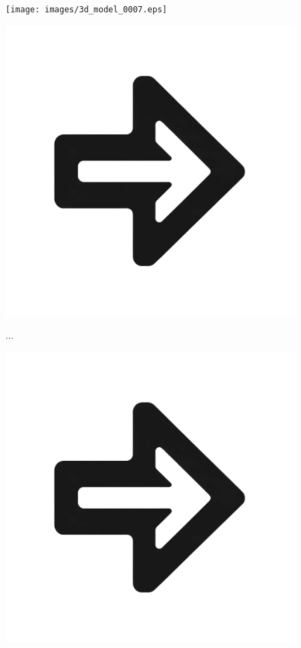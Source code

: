 \documentclass{beamer}
\begin{document}
\begin{frame}
\begin{figure}[htbp]
\begin{minipage}[c][0.35\paperheight][c]{\linewidth}
\begin{minipage}{0.1\linewidth}
			\end{minipage}
			\begin{minipage}{0.19\linewidth}
				\texttt{[image: images/3d\_model\_0007.eps]}
			\end{minipage}
			\begin{minipage}{0.1\linewidth}
				\includegraphics[width=\linewidth]{images/right_arrow.png}
			\end{minipage}
			\begin{minipage}{0.19\linewidth}
				{\huge \hfill .\hfill .\hfill . }
			\end{minipage}
			\begin{minipage}{0.1\linewidth}
				\includegraphics[width=\linewidth]{images/right_arrow.png}

\end{minipage}
\end{minipage}
\end{figure}
\end{frame}
\end{document}
